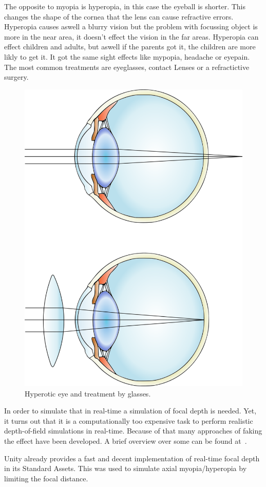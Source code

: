 \documentclass{sig-alternate-05-2015}
\begin{document}
The opposite to myopia is hyperopia, in this case the eyeball is shorter. This changes the shape of the cornea that the lens can cause refractive errors. Hyperopia causes aswell a blurry vision but the problem with focussing object is more in the near area, it doesn't effect the vision in the far areas. Hyperopia can effect children and adults, but aswell if the parents got it, the children are more likly to get it. It got the same sight effects like mypopia, headache or eyepain. The most common treatments are eyeglasses, contact Lenses or a refractictive surgery. 
%
\begin{figure}
    \centering
    \includegraphics[width=0.7\columnwidth]{hyperopia.png}
    \caption{Hyperotic eye and treatment by glasses.}
    \label{fig:hyperopia}
\end{figure}
%
In order to simulate that in real-time a simulation of focal depth is needed.
Yet, it turns out that it is a computationally too expensive task to perform realistic depth-of-field simulations in real-time.
Because of that many approaches of faking the effect have been developed.
A brief overview over some can be found at~\cite{gpugems-DoF}.

Unity already provides a fast and decent implementation of real-time focal depth in its Standard Assets.
This was used to simulate axial myopia/hyperopia by limiting the focal distance.
\end{document}
